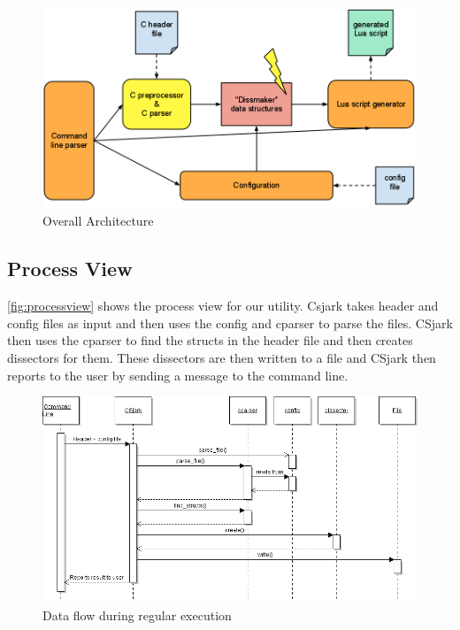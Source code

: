 \begin{figure}[htb]
	\includegraphics[width=\textwidth]{./planning/img/overall_design}
	\caption{Overall Architecture\label{fig:logicalview}}
\end{figure}


\subsection{Process View}
\autoref{fig:processview} shows the process view for our utility. Csjark takes header and config files as input and then uses the config and cparser to parse the files. CSjark then uses the cparser to find the structs in the header file and then creates dissectors for them. These dissectors are then written to a file and CSjark then reports to the user by sending a message to the command line.

\begin{figure}[htb]
	\includegraphics[width=\textwidth]{./planning/img/SequenceDiagram}
	\caption{Data flow during regular execution\label{fig:processview}}
\end{figure}


